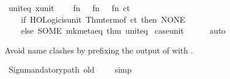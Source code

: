 \begin{isabellebody}
\ unit{\isacharunderscore}{\kern0pt}eq\ {\isacharparenleft}{\kern0pt}{\isachardoublequoteopen}x{\isacharcolon}{\kern0pt}{\isacharcolon}{\kern0pt}unit{\isachardoublequoteclose}{\isacharparenright}{\kern0pt}\ {\isacharequal}{\kern0pt}\ {\isacartoucheopen}\isanewline
\ \ fn\ {\isacharunderscore}{\kern0pt}\ {\isacharequal}{\kern0pt}{\isachargreater}{\kern0pt}\ fn\ {\isacharunderscore}{\kern0pt}\ {\isacharequal}{\kern0pt}{\isachargreater}{\kern0pt}\ fn\ ct\ {\isacharequal}{\kern0pt}{\isachargreater}{\kern0pt}\isanewline
\ \ \ \ if\ HOLogic{\isachardot}{\kern0pt}is{\isacharunderscore}{\kern0pt}unit\ {\isacharparenleft}{\kern0pt}Thm{\isachardot}{\kern0pt}term{\isacharunderscore}{\kern0pt}of\ ct{\isacharparenright}{\kern0pt}\ then\ NONE\isanewline
\ \ \ \ else\ SOME\ {\isacharparenleft}{\kern0pt}mk{\isacharunderscore}{\kern0pt}meta{\isacharunderscore}{\kern0pt}eq\ {\isacharat}{\kern0pt}{\isacharbraceleft}{\kern0pt}thm\ unit{\isacharunderscore}{\kern0pt}eq{\isacharbraceright}{\kern0pt}{\isacharparenright}{\kern0pt}\isanewline
{\isacartoucheclose}%
\endisatagML
{\isafoldML}%
%
\isadelimML
%
\endisadelimML
\isanewline
\isanewline
{}\isamarkupfalse%
\ case{\isacharunderscore}{\kern0pt}unit\ \ {\isachardoublequoteopen}{\isacharparenleft}{\kern0pt}{\isacharparenright}{\kern0pt}{\isachardoublequoteclose}\isanewline
%
\isadelimproof
\ \ %
\endisadelimproof
%
\isatagproof
{}\isamarkupfalse%
\ auto%
\endisatagproof
{\isafoldproof}%
%
\isadelimproof
%
\endisadelimproof
%
\begin{isamarkuptext}%
Avoid name clashes by prefixing the output of  with .%
\end{isamarkuptext}\isamarkuptrue%
%
\isadelimML
%
\endisadelimML
%
\isatagML
{}\isamarkupfalse%
\ {\isacartoucheopen}Sign{\isachardot}{\kern0pt}mandatory{\isacharunderscore}{\kern0pt}path\ {\isachardoublequote}{\kern0pt}old{\isachardoublequote}{\kern0pt}{\isacartoucheclose}%
\endisatagML
{\isafoldML}%
%
\isadelimML
%
\endisadelimML
\isanewline
\isanewline
{}\isamarkupfalse%
\ {\isachardoublequoteopen}{\isacharparenleft}{\kern0pt}{\isacharparenright}{\kern0pt}{\isachardoublequoteclose}%
\isadelimproof
\ %
\endisadelimproof
%
\isatagproof
{}\isamarkupfalse%
\ simp%
\endisatagproof
{\isafoldproof}%
%
\isadelimproof
%
\endisadelimproof
\isanewline
%
\isadelimML
\isanewline

\end{isabellebody}
